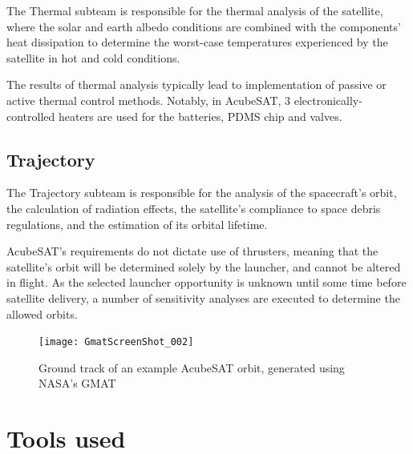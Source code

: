 \documentclass[a4paper,nobib]{tufte-book}
\begin{document}
The Thermal subteam is responsible for the thermal analysis of the satellite, where the solar and earth albedo conditions are combined with the components' heat dissipation to determine the worst-case temperatures experienced by the satellite in hot and cold conditions.

The results of thermal analysis typically lead to implementation of passive or active thermal control methods. Notably, in AcubeSAT, 3 electronically-controlled heaters are used for the batteries, \acs{PDMS} chip and valves.

\subsection{Trajectory}

The Trajectory subteam is responsible for the analysis of the spacecraft's orbit, the calculation of radiation effects, the satellite's compliance to space debris regulations, and the estimation of its orbital lifetime.

AcubeSAT's requirements do not dictate use of thrusters, meaning that the satellite's orbit will be determined solely by the launcher, and cannot be altered in flight. As the selected launcher opportunity is unknown until some time before satellite delivery, a number of sensitivity analyses are executed to determine the allowed orbits.

\begin{figure}
	\texttt{[image: GmatScreenShot\_002]}
	\caption[Ground track of an example AcubeSAT orbit, generated using NASA's GMAT]{Ground track of an example AcubeSAT orbit, generated using NASA's \acl{GMAT} \autocite{nasa_general_mission}}
	\label{fig:gmat}
\end{figure}


\section{Tools used}
\end{document}
